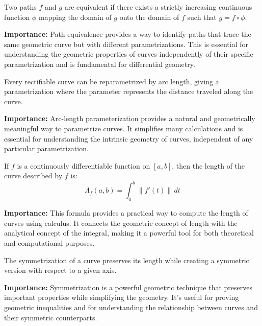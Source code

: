 \begin{definition}
Two paths $f$ and $g$ are equivalent if there exists a strictly increasing continuous function $\phi$ mapping the domain of $g$ onto the domain of $f$ such that $g = f \circ \phi$.
\end{definition}

\noindent\textbf{Importance:} Path equivalence provides a way to identify paths that trace the same geometric curve but with different parametrizations. This is essential for understanding the geometric properties of curves independently of their specific parametrization and is fundamental for differential geometry.



\begin{theorem}
Every rectifiable curve can be reparametrized by arc length, giving a parametrization where the parameter represents the distance traveled along the curve.
\end{theorem}

\noindent\textbf{Importance:} Arc-length parameterization provides a natural and geometrically meaningful way to parametrize curves. It simplifies many calculations and is essential for understanding the intrinsic geometry of curves, independent of any particular parametrization.



\begin{theorem}
If $f$ is a continuously differentiable function on $[a, b]$, then the length of the curve described by $f$ is:
\[\Lambda_f(a, b) = \int_a^b \|f'(t)\| \, dt\]
\end{theorem}

\noindent\textbf{Importance:} This formula provides a practical way to compute the length of curves using calculus. It connects the geometric concept of length with the analytical concept of the integral, making it a powerful tool for both theoretical and computational purposes.



\begin{theorem}
The symmetrization of a curve preserves its length while creating a symmetric version with respect to a given axis.
\end{theorem}

\noindent\textbf{Importance:} Symmetrization is a powerful geometric technique that preserves important properties while simplifying the geometry. It's useful for proving geometric inequalities and for understanding the relationship between curves and their symmetric counterparts.





